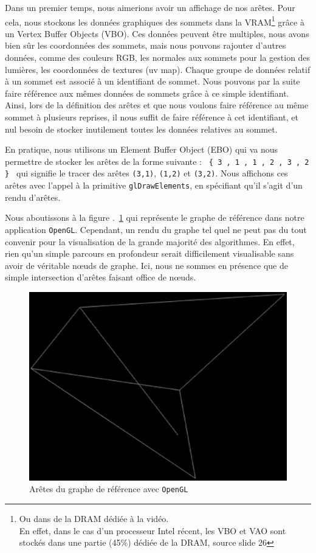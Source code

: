 \documentclass[a4paper, 11pt]{article}
\begin{document}
Dans un premier temps, nous aimerions avoir un affichage de nos arêtes. Pour cela, nous stockons les données graphiques des sommets dans la VRAM\footnote{Ou dans de la DRAM dédiée à la vidéo.\\En effet, dans le cas d'un processeur Intel récent, les VBO et VAO sont stockés dans une partie (45\%) dédiée de la DRAM, source \cite{intel} slide 26} grâce à un Vertex Buffer Objects (VBO). Ces données peuvent être multiples, nous avons bien sûr les coordonnées des sommets, mais nous pouvons rajouter d'autres données, comme des couleurs RGB, les normales aux sommets pour la gestion des lumières, les coordonnées de textures (uv map). Chaque groupe de données relatif à un sommet est associé à un identifiant de sommet. Nous pouvons par la suite faire référence aux mêmes données de sommets grâce à ce simple identifiant. Ainsi, lors de la définition des arêtes et que nous voulons faire référence au même sommet à plusieurs reprises, il nous suffit de faire référence à cet identifiant, et nul besoin de stocker inutilement toutes les données relatives au sommet.

En pratique, nous utilisons un Element Buffer Object (EBO) qui va nous permettre de stocker les arêtes de la forme suivante : \texttt{ \{ 3 , 1 , 1 , 2 , 3 , 2 \} } qui signifie le tracer des arêtes \texttt{(3,1)}, \texttt{(1,2)} et \texttt{(3,2)}. Nous affichons ces arêtes avec l'appel à la primitive \texttt{glDrawElements}, en spécifiant qu'il s'agit d'un rendu d'arêtes.

Nous aboutissons à la figure .~\ref{fig:gledge} qui représente le graphe de référence dans notre application \texttt{OpenGL}. Cependant, un rendu du graphe tel quel ne peut pas du tout convenir pour la visualisation de la grande majorité des algorithmes. En effet, rien qu'un simple parcours en profondeur serait difficilement visualisable sans avoir de véritable nœuds de graphe. Ici, nous ne sommes en présence que de simple intersection d'arêtes faisant office de nœuds.

\begin{figure}[ht]
  \begin{center}
    \includegraphics[scale=0.4]{contents/edge}
  \end{center}
  \caption{Arêtes du graphe de référence avec \texttt{OpenGL}}
  \label{fig:gledge}
\end{figure}
\end{document}
